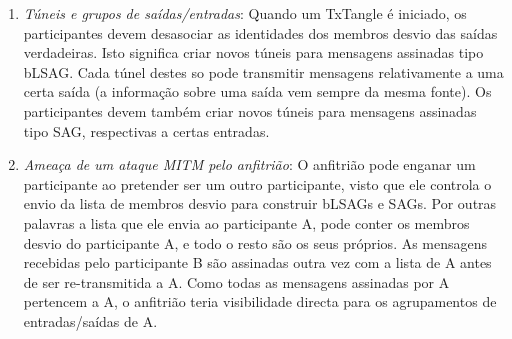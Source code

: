 \begin{enumerate}
    \item {\em Túneis e grupos de saídas/entradas}: Quando um TxTangle é iniciado, os participantes devem desasociar as identidades dos membros desvio das saídas verdadeiras. Isto significa criar novos túneis para mensagens assinadas tipo bLSAG. Cada túnel destes so pode transmitir mensagens relativamente a uma certa saída (a informação sobre uma saída vem sempre da mesma fonte). Os participantes devem também criar novos túneis para mensagens assinadas tipo SAG, respectivas a certas entradas.  
    \item {\em Ameaça de um ataque MITM pelo anfitrião}: 
O anfitrião pode enganar um participante ao pretender ser um outro participante, visto que ele controla o envio da lista de membros desvio para construir bLSAGs e SAGs. Por outras palavras a lista que ele envia ao participante A, pode conter os membros desvio do participante A, e todo o resto são os seus próprios. As mensagens recebidas pelo participante B são assinadas outra vez com a lista de A antes de ser re-transmitida a A. Como todas as mensagens assinadas por A pertencem a A, o anfitrião teria visibilidade directa para os agrupamentos de entradas/saídas de A.


\end{enumerate}
